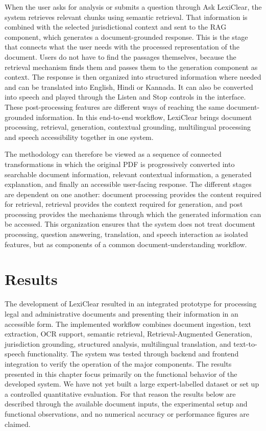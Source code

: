 \documentclass[12pt,a4paper,oneside]{report}
\begin{document}
When the user asks for analysis or submits a question through Ask LexiClear, the system retrieves relevant chunks using semantic retrieval. That information is combined with the selected jurisdictional context and sent to the RAG component, which generates a document-grounded response. This is the stage that connects what the user needs with the processed representation of the document. Users do not have to find the passages themselves, because the retrieval mechanism finds them and passes them to the generation component as context. The response is then organized into structured information where needed and can be translated into English, Hindi or Kannada. It can also be converted into speech and played through the Listen and Stop controls in the interface. These post-processing features are different ways of reaching the same document-grounded information. In this end-to-end workflow, LexiClear brings document processing, retrieval, generation, contextual grounding, multilingual processing and speech accessibility together in one system.

The methodology can therefore be viewed as a sequence of connected
transformations in which the original PDF is progressively converted into
searchable document information, relevant contextual information, a
generated explanation, and finally an accessible user-facing response. The
different stages are dependent on one another: document processing provides
the content required for retrieval, retrieval provides the context required
for generation, and post processing provides the mechanisms through which
the generated information can be accessed. This organization ensures that
the system does not treat document processing, question answering,
translation, and speech interaction as isolated features, but as components
of a common document-understanding workflow.

\chapter{Results}

The development of LexiClear resulted in an integrated prototype for processing legal and administrative documents and presenting their information in an accessible form. The implemented workflow combines document ingestion, text extraction, OCR support, semantic retrieval, Retrieval-Augmented Generation, jurisdiction grounding, structured analysis, multilingual translation, and text-to-speech functionality. The system was tested through backend and frontend integration to verify the operation of the major components. The results presented in this chapter focus primarily on the functional behavior of the developed system. We have not yet built a large expert-labelled dataset or set up a controlled quantitative evaluation. For that reason the results below are described through the available document inputs, the experimental setup and functional observations, and no numerical accuracy or performance figures are claimed.
\end{document}
